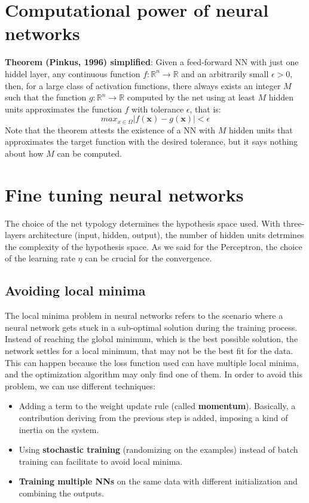 \section{Computational power of neural networks}
\textbf{Theorem (Pinkus, 1996) simplified}:\newline
Given a feed-forward NN with just one hiddel layer, any continuous function $f:\mathbb{R}^{n} \rightarrow \mathbb{R}$ and an arbitrarily small $\epsilon > 0$, then, for a large class of activation functions, there always exists an integer $M$ such that the function $g: \mathbb{R}^{n} \rightarrow \mathbb{R}$ computed by the net using at least $M$ hidden units approximates the function $f$ with tolerance $\epsilon$, that is:
\[max_{x \in \Omega}|f(\textbf{x}) - g(\textbf{x})| < \epsilon\]
Note that the theorem attests the existence of a NN with $M$ hidden units that approximates the target function with the desired tolerance, but it says nothing about how $M$ can be computed.

\section{Fine tuning neural networks}
The choice of the net typology determines the hypothesis space used. With three-layers architecture (input, hidden, output), the number of hidden units detrmines the complexity of the hypothesis space. As we said for the Perceptron, the choice of the learning rate $\eta$ can be crucial for the convergence.
\subsection{Avoiding local minima}
The local minima problem in neural networks refers to the scenario where a neural network gets stuck in a sub-optimal solution during the training process. Instead of reaching the global minimum, which is the best possible solution, the network settles for a local minimum, that may not be the best fit for the data. This can happen because the loss function used can have multiple local minima, and the optimization algorithm may only find one of them. In order to avoid this problem, we can use different techniques:
\begin{itemize}
    \item Adding a term to the weight update rule (called \textbf{momentum}). Basically, a contribution deriving from the previous step is added, imposing a kind of inertia on the system.

    \item Using \textbf{stochastic training} (randomizing on the examples) instead of batch training can facilitate to avoid local minima.

    \item \textbf{Training multiple NNs} on the same data with different initialization and combining the outputs.
\end{itemize}


